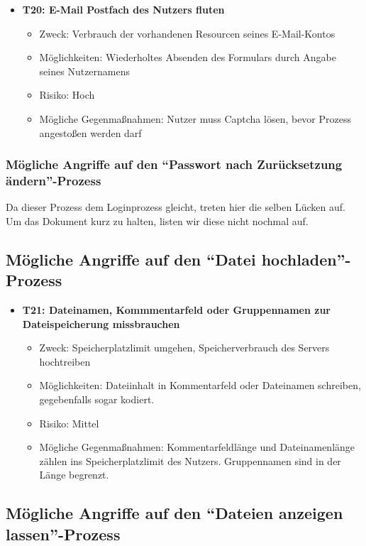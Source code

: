 \documentclass[12pt,DIV14,BCOR10mm,a4paper,parskip=half-,headsepline,headinclude,english,ngerman,bibliography=totocnumbered]{scrreprt}
\begin{document}
\begin{itemize}
  \hypertarget{threat20}{}
  \item \textbf{T20: E-Mail Postfach des Nutzers fluten}
  \begin{itemize}
  \item Zweck: Verbrauch der vorhandenen Resourcen seines E-Mail-Kontos
  \item Möglichkeiten: Wiederholtes Absenden des Formulars durch Angabe seines Nutzernamens
  \item Risiko: Hoch
  \item Mögliche Gegenmaßnahmen: Nutzer muss Captcha lösen, bevor Prozess angestoßen werden darf
  \end{itemize}
\end{itemize}

\subsubsection{Mögliche Angriffe auf den \enquote{Passwort nach Zurücksetzung ändern}-Prozess}

Da dieser Prozess dem Loginprozess gleicht, treten hier die selben Lücken auf.
Um das Dokument kurz zu halten, listen wir diese nicht nochmal auf.

\subsection{Mögliche Angriffe auf den \enquote{Datei hochladen}-Prozess}

\begin{itemize}
  \hypertarget{threat21}{}
  \item \textbf{T21: Dateinamen, Kommmentarfeld oder Gruppennamen zur Dateispeicherung missbrauchen}
  \begin{itemize}
  \item Zweck: Speicherplatzlimit umgehen, Speicherverbrauch des Servers hochtreiben
  \item Möglichkeiten: Dateiinhalt in Kommentarfeld oder Dateinamen schreiben, gegebenfalls sogar kodiert.
  \item Risiko: Mittel
  \item Mögliche Gegenmaßnahmen: Kommentarfeldlänge und Dateinamenlänge zählen ins Speicherplatzlimit des Nutzers. Gruppennamen sind in der Länge begrenzt.
  \end{itemize}
\end{itemize}

\subsection{Mögliche Angriffe auf den \enquote{Dateien anzeigen lassen}-Prozess}
\end{document}
